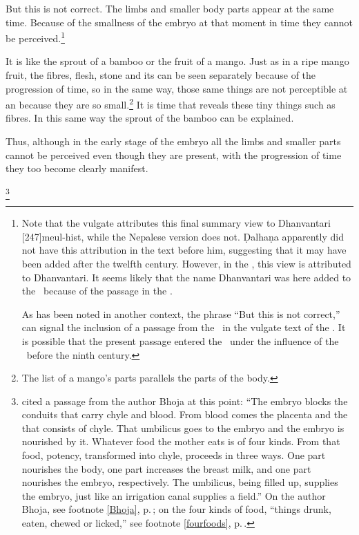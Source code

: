 \begin{translation}
    But this is not correct.  The limbs and smaller body parts appear
at the same time.  Because of the smallness of the embryo at that
moment in time they cannot be perceived.\footnote{Note that the
    vulgate attributes this final summary view to Dhanvantari 
    [247]{meul-hist}, while the Nepalese
    version does not. Ḍalhaṇa apparently did not have this attribution
    in the text before him, suggesting that it may have been added
    after the twelfth century.  However, in the \CS, this view is attributed to 
    Dhanvantari.  It seems likely that the name Dhanvantari was here added to 
    the \SS\ because of the passage in the \CS.
    
    As has been noted in another context, the phrase  
    “But this is not correct,” can signal the inclusion of a passage from the \CS\ in 
    the vulgate text of the \SS \citep{wuja-2025}.  It is possible that the present 
    passage entered the \SS\ under the influence of the \CS\ before the ninth 
    century.}
        
        It is like the sprout of a bamboo or the fruit of a mango.
Just as in a ripe mango fruit, the fibres, flesh, stone and
its  can be seen separately because of the
progression of time, so in the same way, those same things are
not perceptible at an  because they
are so small.\footnote{The list of a mango's parts parallels
    the parts of the body.} It is time that reveals these tiny
    things such as fibres. In this same way the sprout of the
    bamboo can be explained.
    
    Thus, although in the early stage of the embryo all the limbs and 
    smaller parts cannot be perceived even though they 
    are present, 
    with the progression of time they too become clearly manifest. 
    


    
\footnote{ cited a passage from the author Bhoja
    at this point:  “The
    embryo blocks the conduits that carry chyle and blood. From blood
    comes the placenta and the  that consists of
    chyle. That umbilicus goes to the embryo and the embryo is nourished
    by it. Whatever food the mother eats is of four kinds. From that food,
    potency, transformed into chyle, proceeds in three ways.  One part
    nourishes the body, one part increases the breast milk, and one part
    nourishes the embryo, respectively.  The umbilicus, being filled up,
    supplies the embryo, just like an irrigation canal supplies a field.” 
    On the author Bhoja, see footnote \ref{Bhoja}, p.\,\pageref{Bhoja}; on
    the four kinds of food,  “things drunk, eaten, chewed or licked,” see
    footnote \ref{fourfoods}, p.\,\pageref{fourfoods}.}




\end{translation}
